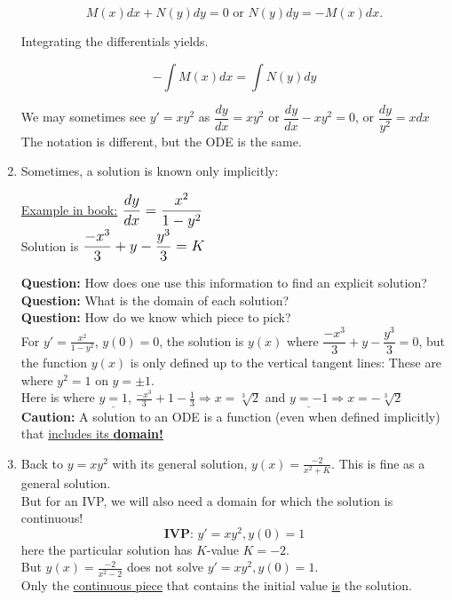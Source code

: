 \begin{enumerate}[label=\protect\circled{\arabic*}]
\begin{equation*}
	 	M(x)dx + N(y)dy = 0 \text{ or } N(y)dy = -M(x)dx.
	 \end{equation*}
	 \begin{center}
	 Integrating the differentials yields.	
	 \end{center}
	 \begin{equation*}
	 	-\int M(x)dx = \int N(y)dy
	 \end{equation*}
	 \begin{example-N}
	 	We may sometimes see $y' = xy^2$ as $\dfrac{dy}{dx} = xy^2$ or $\dfrac{dy}{dx} - xy^2 = 0$, or $\dfrac{dy}{y^2} = xdx$\\
	 	The notation is different, but the ODE is the same.
	 \end{example-N}
	 \item Sometimes, a solution is known only implicitly:
	 \begin{center}
	 	\underline{Example in book:} \quad \quad $\mathlarger{\mathlarger{\dfrac{dy}{dx} = \frac{x^2}{1-y^2}}}$\\
	 	Solution is $\mathlarger{\mathlarger{\frac{-x^3}{3} + y -\frac{y^3}{3} = K}}$
	 \end{center}
	 
	\textbf{Question:} How does one use this information to find an explicit solution?\\
	\textbf{Question:} What is the domain of each solution?\\
	\textbf{Question:} How do we know which piece to pick?\\
	 \newline
	 For $y' = \frac{x^2}{1-y^2}$, $y(0) = 0$, the solution is $y(x)$ where $\dfrac{-x^3}{3} + y - \dfrac{y^3}{3} = 0$, but the function $y(x)$ is only defined up to the vertical tangent lines: These are where $y^2 = 1$ on $y = \pm 1$.\\
	 Here is where $\underline{y = 1}$, $\frac{-x^3}{3} + 1 -\frac{1}{3} \Rightarrow x = \sqrt[3]{2}$ and $\underline{y = -1} \Rightarrow x = -\sqrt[3]{2}$\\
	 \textbf{Caution:} A solution to an ODE is a function (even when defined implicitly) that \underline{includes its \textbf{domain!}}
	 \item Back to $y = xy^2$ with its general solution, $y(x) = \frac{-2}{x^2 + K}$. This is fine as a general solution.\\
	 But for an IVP, we will also need a domain for which the solution is continuous!
	 \begin{equation*}
	 	\textbf{IVP: } y' = xy^2, y(0) = 1
	 \end{equation*}
	 here the particular solution has $K$-value $K = -2$.\\
	 But $y(x) = \frac{-2}{x^2-2}$ does not solve $y' = xy^2, y(0) = 1$.\\
	 Only the \underline{continuous piece} that contains the initial value \underline{is} the solution.


\end{enumerate}
